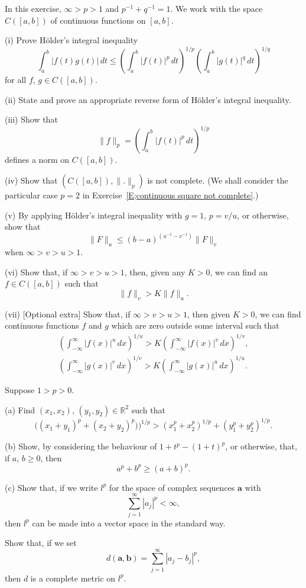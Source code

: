 \begin{exercise}\label{E;integral Holder}\label{C1.1} In 
this exercise, $\infty>p>1$
and $p^{-1}+q^{-1}=1$.
We work with the space $C([a,b])$ of continuous functions
on $[a,b]$.

(i) Prove H{\"o}lder's integral inequality
\[\int_{a}^{b}|f(t)g(t)|\,dt\leq 
\left(\int_{a}^{b}|f(t)|^{p}\,dt\right)^{1/p}
\left(\int_{a}^{b}|g(t)|^{q}\,dt\right)^{1/q}\]
for all $f,\,g\in C([a,b])$.

(ii) State and prove an appropriate reverse form of
H{\"o}lder's integral inequality.

(iii) Show that
\[\|f\|_{p}=\left(\int_{a}^{b}|f(t)|^{p}\,dt\right)^{1/p}\]
defines a norm on $C([a,b])$.

(iv) Show that $(C([a,b]),\|.\|_{p})$ is not complete.
(We shall consider the particular case $p=2$
in Exercise~\ref{E;continuous square not complete}.) 

(v) By applying  H{\"o}lder's integral inequality
with $g=1$, $p=v/u$, or otherwise, show that
\[\|F\|_{u}\leq (b-a)^{(u^{-1}-v^{-1})}\|F\|_{v}\]
when $\infty>v>u>1$. 

(vi) Show that, if  $\infty>v>u>1$, then, given
any $K>0$, we can find an $f\in C([a,b])$ such that
\[\|f\|_{v}>K\|f\|_{u}.\]


(vii) [Optional extra] Show that, if $\infty>v>u>1$, then 
given $K>0$, we can find continuous functions
$f$ and $g$ which are zero outside some interval
such that
\begin{gather*}
\left(\int_{-\infty}^{\infty}|f(x)|^{u}\,dx\right)^{1/u}
>K\left(\int_{-\infty}^{\infty}|f(x)|^{v}\,dx\right)^{1/v},\\
\left(\int_{-\infty}^{\infty}|g(x)|^{v}\,dx\right)^{1/v}
>K\left(\int_{-\infty}^{\infty}|g(x)|^{u}\,dx\right)^{1/u}.
\end{gather*}
\end{exercise}
\begin{exercise}\label{C1.2} Suppose $1>p>0$.

(a) Find $(x_{1},x_{2}),\,(y_{1},y_{2})\in{\mathbb R}^{2}$
such that
\[\big((x_{1}+y_{1})^{p}+(x_{2}+y_{2})^{p})\big)^{1/p}
> (x_{1}^{p}+x_{2}^{p})^{1/p}+(y_{1}^{p}+y_{2}^{p})^{1/p}.\]

(b) Show, by considering the behaviour of
$1+t^{p}-(1+t)^{p}$, or otherwise, that, if $a,\,b\geq 0$,
then 
\[a^{p}+b^{p}\geq(a+b)^{p}.\]

(c) Show that, if we write $l^{p}$ for the space of complex
sequences ${\mathbf a}$ with
\[\sum_{j=1}^{\infty}|a_{j}|^{p}<\infty,\]
then $l^{p}$ can be made into a vector space in the standard way.

Show that, if we set
\[d({\mathbf a},{\mathbf b})=\sum_{j=1}^{\infty}|a_{j}-b_{j}|^{p},\]
then $d$ is a complete metric on $l^{p}$.
\end{exercise}
